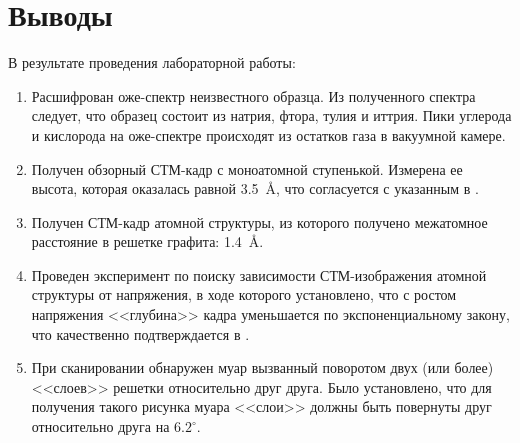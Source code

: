 \documentclass[a4paper, 12pt]{article}
\begin{document}
\section{Выводы}

В результате проведения лабораторной работы:

\begin{enumerate}
	\item Расшифрован оже-спектр неизвестного образца. Из полученного спектра следует, что образец состоит из натрия, фтора, тулия и иттрия. Пики углерода и кислорода на оже-спектре происходят из остатков газа в вакуумной камере.
	
	\item Получен обзорный СТМ-кадр с моноатомной ступенькой. Измерена ее высота, которая оказалась равной 3.5~\AA, что согласуется с указанным в \cite{Article}.
	
	\item Получен СТМ-кадр атомной структуры, из которого получено межатомное расстояние в решетке графита: 1.4~\AA.
	
	\item Проведен эксперимент по поиску зависимости СТМ-изображения атомной структуры от напряжения, в ходе которого установлено, что с ростом напряжения <<глубина>> кадра уменьшается по экспоненциальному закону, что качественно подтверждается в \cite{STM_Binnig}.
	
	\item При сканировании обнаружен муар вызванный поворотом двух (или более) <<слоев>> решетки относительно друг друга. Было установлено, что для получения такого рисунка муара <<слои>> должны быть повернуты друг относительно друга на $6.2^\circ$.
\end{enumerate}

\newpage
\end{document}
